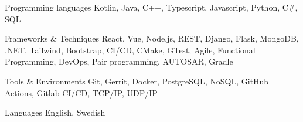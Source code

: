 
\begin{cvskills}

  \cvskill
    {Programming languages} %
    {Kotlin, Java, C++, Typescript, Javascript, Python, C\#, SQL} %

  \cvskill
    {Frameworks \& Techniques} %
    {React, Vue, Node.js, REST, Django, Flask, MongoDB, .NET, Tailwind, Bootstrap, CI/CD, CMake, GTest, Agile, Functional Programming, DevOps, Pair programming, AUTOSAR, Gradle } %

  \cvskill
    {Tools \& Environments} %
    {Git, Gerrit, Docker, PostgreSQL, NoSQL, GitHub Actions, Gitlab CI/CD, TCP/IP, UDP/IP } %

  \cvskill
    {Languages} %
    {English, Swedish} %

\end{cvskills}
